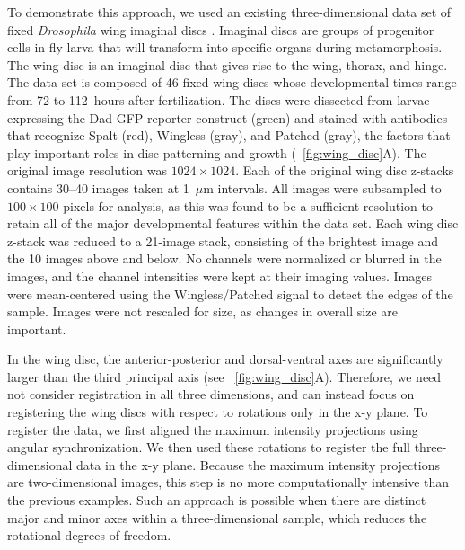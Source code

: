 To demonstrate this approach, we used an existing three-dimensional data set of fixed {\em Drosophila} wing imaginal discs \citep{hamaratoglu2011dpp}.
%
Imaginal discs are groups of progenitor cells in fly larva that will transform into specific organs during metamorphosis.
%
The wing disc is an imaginal disc that gives rise to the wing, thorax, and hinge.
%
The data set is composed of 46 fixed wing discs whose developmental times range from 72 to 112~hours after fertilization.
% 
The discs were dissected from larvae expressing the Dad-GFP reporter construct (green) and stained with antibodies that recognize Spalt (red), Wingless (gray), and Patched (gray), the factors that play important roles in disc patterning and growth (\fig~\ref{fig:wing_disc}A).
%
The original image resolution was $1024 \times 1024$.
%
Each of the original wing disc z-stacks contains 30--40 images taken at 1~$\mu$m intervals.
%
All images were subsampled to $100 \times 100$ pixels for analysis, as this was found to be a sufficient resolution to retain all of the major developmental features within the data set.
%
Each wing disc z-stack was reduced to a 21-image stack, consisting of the brightest image and the 10 images above and below.
%
No channels were normalized or blurred in the images, and the channel intensities were kept at their imaging values.
%
Images were mean-centered using the Wingless/Patched signal to detect the edges of the sample.
%
Images were not rescaled for size, as changes in overall size are important.

In the wing disc, the anterior-posterior and dorsal-ventral axes are significantly larger than the third principal axis (see \fig~\ref{fig:wing_disc}A).
%
Therefore, we need not consider registration in all three dimensions, and can instead focus on registering the wing discs with respect to rotations only in the x-y plane.
%
To register the data, we first aligned the maximum intensity projections using angular synchronization.
%
We then used these rotations to register the full three-dimensional data in the x-y plane.
%
Because the maximum intensity projections are two-dimensional images, this step is no more computationally intensive than the previous examples.
%
Such an approach is possible when there are distinct major and minor axes within a three-dimensional sample, which reduces the rotational degrees of freedom.

